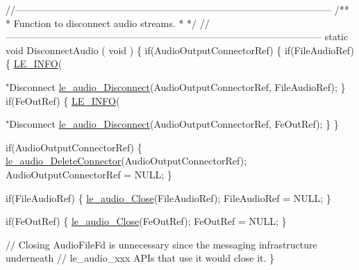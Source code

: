\begin{DoxyCodeInclude}
\textcolor{comment}{//--------------------------------------------------------------------------------------------------}\textcolor{comment}{}
\textcolor{comment}{/**}
\textcolor{comment}{ * Function to disconnect audio streams.}
\textcolor{comment}{ *}
\textcolor{comment}{ */}
\textcolor{comment}{//--------------------------------------------------------------------------------------------------}
\textcolor{keyword}{static} \textcolor{keywordtype}{void} DisconnectAudio
(
    \textcolor{keywordtype}{void}
)
\{
    \textcolor{keywordflow}{if}(AudioOutputConnectorRef)
    \{
        \textcolor{keywordflow}{if}(FileAudioRef)
        \{
            \hyperlink{le__log_8h_a23e6d206faa64f612045d688cdde5808}{LE\_INFO}(\textcolor{stringliteral}{"Disconnect %
            \hyperlink{le__audio__interface_8h_a6b88df9301038375701e4c15a4c8aaf0}{le\_audio\_Disconnect}(AudioOutputConnectorRef, FileAudioRef);
        \}
        \textcolor{keywordflow}{if}(FeOutRef)
        \{
            \hyperlink{le__log_8h_a23e6d206faa64f612045d688cdde5808}{LE\_INFO}(\textcolor{stringliteral}{"Disconnect %
            \hyperlink{le__audio__interface_8h_a6b88df9301038375701e4c15a4c8aaf0}{le\_audio\_Disconnect}(AudioOutputConnectorRef, FeOutRef);
        \}
    \}

    \textcolor{keywordflow}{if}(AudioOutputConnectorRef)
    \{
        \hyperlink{le__audio__interface_8h_a3f40b13ff980040503927f59bb3e86a9}{le\_audio\_DeleteConnector}(AudioOutputConnectorRef);
        AudioOutputConnectorRef = NULL;
    \}

    \textcolor{keywordflow}{if}(FileAudioRef)
    \{
        \hyperlink{le__audio__interface_8h_abafeb411da7b1a14b2d5777fc1d3e394}{le\_audio\_Close}(FileAudioRef);
        FileAudioRef = NULL;
    \}

    \textcolor{keywordflow}{if}(FeOutRef)
    \{
        \hyperlink{le__audio__interface_8h_abafeb411da7b1a14b2d5777fc1d3e394}{le\_audio\_Close}(FeOutRef);
        FeOutRef = NULL;
    \}

    \textcolor{comment}{// Closing AudioFileFd is unnecessary since the messaging infrastructure underneath}
    \textcolor{comment}{// le\_audio\_xxx APIs that use it would close it.}
\}


}}
\end{DoxyCodeInclude}
